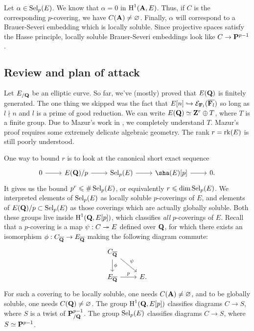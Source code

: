 Let $\alpha\in \operatorname{Sel}_p(E)$. We know that $\alpha=0$ in 
$\operatorname{H}^1(\mathbf{A},E)$. Thus, if $C$ is the corresponding $p$-covering, we have 
$C(\mathbf{A})\ne\varnothing$. Finally, $\alpha$ will correspond to a Brauer-Severi 
embedding which is locally soluble. Since projective spaces satisfy the 
Hasse principle, locally soluble Brauer-Severi embeddings look like 
$C\to \mathbf{P}^{p-1}$. 





\subsection{Review and plan of attack}

Let $E_{/\mathbf{Q}}$ be an elliptic curve. So far, we've (mostly) proved that 
$E(\mathbf{Q})$ is finitely generated. The one thing we skipped was the fact that 
$E[n]\hookrightarrow \mathcal{E}_{\mathbf{F}_l}(\overline{\mathbf{F}_l})$ so long as $l\nmid n$ and 
$l$ is a prime of good reduction. We can write $E(\mathbf{Q})\simeq\mathbf{Z}^r\oplus T$, 
where $T$ is a finite group. Due to Mazur's work in \cite{mazur-1977}, 
we completely understand $T$. Mazur's proof requires some extremely delicate 
algebraic geometry. The rank $r=\operatorname{rk}(E)$ is still poorly understood. 

One way to bound $r$ is to look at the canonical short exact sequence 
\[\begin{tikzcd}
  0 \ar[r] 
    & E(\dQ)/p \ar[r] 
    & \selmer_p(E) \ar[r] 
    & \sha(E)[p] \ar[r] 
    & 0 .
\end{tikzcd}\]
It gives us the bound $p^r\leqslant \# \operatorname{Sel}_p(E)$, or equivalently 
$r\leqslant \dim \operatorname{Sel}_p(E)$. We interpreted elements of $\operatorname{Sel}_p(E)$ as 
locally soluble $p$-coverings of $E$, and elements of 
$E(\mathbf{Q})/p\subset \operatorname{Sel}_p(E)$ as those coverings which are actually 
globally soluble. Both these groups live inside $\operatorname{H}^1(\mathbf{Q},E[p])$, which 
classifies \emph{all} $p$-coverings of $E$. Recall that a $p$-covering is 
a map $\psi:C\twoheadrightarrow E$ defined over $\mathbf{Q}$, for which there exists an isomorphism 
$\phi:C_{\overline{\mathbf{Q}}}\to E_{\overline{\mathbf{Q}}}$ making the following diagram 
commute:
\[\begin{tikzcd}
  C_{\overline\dQ} \ar[dr, "\psi"] \ar[d, "\phi"] \\
  E_{\overline\dQ} \ar[r, "p"] 
    & E .
\end{tikzcd}\]
For such a covering to be locally soluble, one needs $C(\mathbf{A})\ne\varnothing$, 
and to be globally soluble, one needs $C(\mathbf{Q})\ne\varnothing$. 
The group $\operatorname{H}^1(\mathbf{Q},E[p])$ classifies diagrams $C\to S$, where $S$ is a twist 
of $\mathbf{P}^{p-1}_{/\mathbf{Q}}$. The group $\operatorname{Sel}_p(E)$ classifies diagrams 
$C\to S$, where $S\simeq \mathbf{P}^{p-1}$. 

